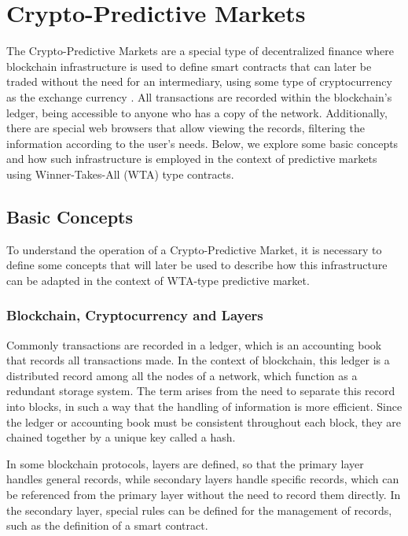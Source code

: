 \section{Crypto-Predictive Markets}
\label{sec:crypto_predictive_markets}

The Crypto-Predictive Markets are a special type of decentralized finance where blockchain infrastructure is used to define smart contracts that can later be traded without the need for an intermediary, using some type of cryptocurrency as the exchange currency \parencite{HassanAmmar2023Fttt}. All transactions are recorded within the blockchain's ledger, being accessible to anyone who has a copy of the network. Additionally, there are special web browsers that allow viewing the records, filtering the information according to the user's needs. Below, we explore some basic concepts and how such infrastructure is employed in the context of predictive markets using Winner-Takes-All (WTA) type contracts.

\subsection{Basic Concepts}
\label{subsec:basic_concepts}

To understand the operation of a Crypto-Predictive Market, it is necessary to define some concepts that will later be used to describe how this infrastructure can be adapted in the context of WTA-type predictive market.

\subsubsection{Blockchain, Cryptocurrency and Layers}
\label{subsubsec:blockchain}

Commonly transactions are recorded in a ledger, which is an accounting book that records all transactions made. In the context of blockchain, this ledger is a distributed record among all the nodes of a network, which function as a redundant storage system. The term arises from the need to separate this record into blocks, in such a way that the handling of information is more efficient. Since the ledger or accounting book must be consistent throughout each block, they are chained together by a unique key called a hash.

In some blockchain protocols, layers are defined, so that the primary layer handles general records, while secondary layers handle specific records, which can be referenced from the primary layer without the need to record them directly. In the secondary layer, special rules can be defined for the management of records, such as the definition of a smart contract.

